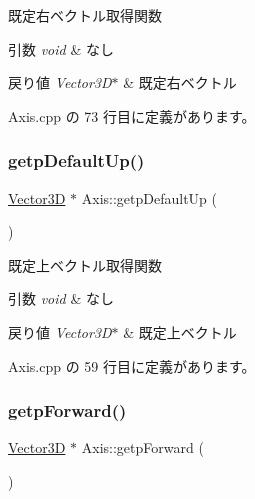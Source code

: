 既定右ベクトル取得関数 


\begin{DoxyParams}{引数}
{\em void} & なし \\
\hline
\end{DoxyParams}

\begin{DoxyRetVals}{戻り値}
{\em Vector3\+D$\ast$} & 既定右ベクトル \\
\hline
\end{DoxyRetVals}


 Axis.\+cpp の 73 行目に定義があります。

\mbox{\label{class_axis_a6461d731bdccbe4d5d28bca3f9125344}} 
\subsubsection{\texorpdfstring{getp\+Default\+Up()}{getpDefaultUp()}}
{\footnotesize\ttfamily \mbox{\hyperlink{class_vector3_d}{Vector3D}} $\ast$ Axis\+::getp\+Default\+Up (\begin{DoxyParamCaption}{ }\end{DoxyParamCaption})}



既定上ベクトル取得関数 


\begin{DoxyParams}{引数}
{\em void} & なし \\
\hline
\end{DoxyParams}

\begin{DoxyRetVals}{戻り値}
{\em Vector3\+D$\ast$} & 既定上ベクトル \\
\hline
\end{DoxyRetVals}


 Axis.\+cpp の 59 行目に定義があります。

\mbox{\label{class_axis_a97ddaeb8484fec8c8c51d8ae45ea6058}} 
\subsubsection{\texorpdfstring{getp\+Forward()}{getpForward()}}
{\footnotesize\ttfamily \mbox{\hyperlink{class_vector3_d}{Vector3D}} $\ast$ Axis\+::getp\+Forward (\begin{DoxyParamCaption}{ }\end{DoxyParamCaption})}



